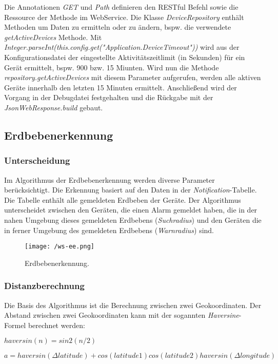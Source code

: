 Die Annotationen \textit{GET} und \textit{Path} definieren den RESTful Befehl sowie die Ressource der Methode im WebService. Die Klasse \textit{DeviceRepository} enthält Methoden um Daten zu ermitteln oder zu ändern, bspw. die verwendete \textit{getActiveDevices} Methode. Mit \textit{Integer.parseInt(this.config.get("Application.DeviceTimeout"))} wird aus der Konfigurationsdatei der eingestellte Aktivitätszeitlimit (in Sekunden) für ein Gerät ermittelt, bspw. 900 bzw. 15 Miunten. Wird nun die Methode \textit{repository.getActiveDevices} mit diesem Parameter aufgerufen, werden alle aktiven Geräte innerhalb den letzten 15 Minuten ermittelt. Anschließend wird der Vorgang in der Debugdatei festgehalten und die Rückgabe mit der \textit{JsonWebResponse.build} gebaut.

\subsection{Erdbebenerkennung}
\subsubsection{Unterscheidung}
Im Algorithmus der Erdbebenerkennung werden diverse Parameter berücksichtigt. Die Erkennung basiert auf den Daten in der \textit{Notification}-Tabelle. Die Tabelle enthält alle gemeldeten Erdbeben der Geräte. Der Algorithmus unterscheidet zwischen den Geräten, die einen Alarm gemeldet haben, die in der nahen Umgebung dieses gemeldeten Erdbebens (\textit{Suchradius}) und den Geräten die in ferner Umgebung des gemeldeten Erdbebens (\textit{Warnradius}) sind.
\medskip
\begin{figure}[H]
\centering
\texttt{[image: /ws-ee.png]}
\caption{Erdbebenerkennung.}
\label{fig:WSEE}
\end{figure}

\subsubsection{Distanzberechnung}
Die Basis des Algorithmus ist die Berechnung zwischen zwei Geokoordinaten. Der Abstand zwischen zwei Geokoordinaten kann mit der sogannten \textit{Haversine}-Formel berechnet werden:

\begin{math}haversin(n) = sin2(n/2)\end{math}

\begin{math}a = haversin(\Delta latitude) + cos(latitude1) cos(latitude2) haversin(\Delta longitude)\end{math}

